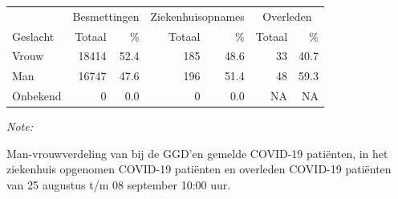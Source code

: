 \documentclass[
  english,
  man,floatsintext]{apa6}
\begin{document}
\begin{table}
\centering\begingroup\fontsize{11}{13}\selectfont

\begin{threeparttable}
\begin{tabular}{lrrrrrr}
\toprule
\multicolumn{1}{c}{ } & \multicolumn{2}{c}{Besmettingen} & \multicolumn{2}{c}{Ziekenhuisopnames} & \multicolumn{2}{c}{Overleden} \\
\cmidrule(l{3pt}r{3pt}){2-3} \cmidrule(l{3pt}r{3pt}){4-5} \cmidrule(l{3pt}r{3pt}){6-7}
Geslacht & Totaal & \% & Totaal & \% & Totaal & \%\\
\midrule
Vrouw & 18414 & 52.4 & 185 & 48.6 & 33 & 40.7\\
Man & 16747 & 47.6 & 196 & 51.4 & 48 & 59.3\\
Onbekend & 0 & 0.0 & 0 & 0.0 & NA & NA\\
\bottomrule
\end{tabular}
\begin{tablenotes}
\item \textit{Note: } 
\item Man-vrouwverdeling van bij de GGD’en gemelde COVID-19 patiënten, in het ziekenhuis opgenomen COVID-19 patiënten en overleden COVID-19 patiënten van 25 augustus t/m 08 september 10:00 uur.
\end{tablenotes}
\end{threeparttable}
\endgroup{}
\end{table}
\newpage
\end{document}
